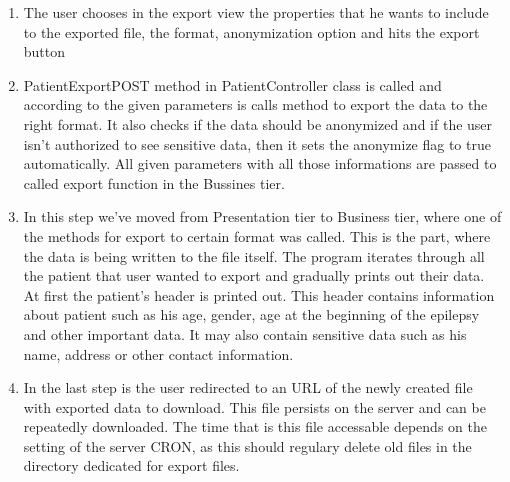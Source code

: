 \documentclass[thesis=B,english]{FITthesis}[2012/10/20]
\begin{document}
\begin{enumerate}
\item{ The user chooses in the export view the properties that he wants to include to the exported file, the format, anonymization option and hits the export button }
\item{ PatientExportPOST method in PatientController class is called and according to the given parameters is calls method to export the data to the right format. It also checks if the data should be anonymized and if the user isn't authorized to see sensitive data, then it sets the anonymize flag to true automatically. All given parameters with all those informations are passed to called export function in the Bussines tier.}
\item{ In this step we've moved from Presentation tier to Business tier, where one of the methods for export to certain format was called. This is the part, where the data is being written to the file itself. The program iterates through all the patient that user wanted to export and gradually prints out their data.}
At first the patient's header is printed out. This header contains information about patient such as his age, gender, age at the beginning of the epilepsy and other important data. It may also contain sensitive data such as his name, address or other contact information.
\item{ In the last step is the user redirected to an URL of the newly created file with exported data to download. This file persists on the server and can be repeatedly downloaded. The time that is this file accessable depends on the setting of the server CRON, as this should regulary delete old files in the directory dedicated for export files.}

\end{enumerate}
\end{document}
